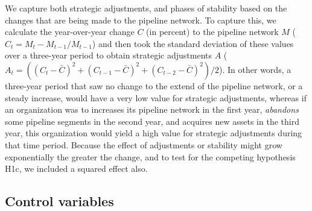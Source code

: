 We capture both strategic adjustments, and phases of stability based on the changes that are being made to the pipeline network. To capture this, we calculate the year-over-year change $C$ (in percent) to the pipeline network $M$ ($C_{t} = M_{t} - M_{t-1}/M_{t-1}$) and then took the standard deviation of these values over a three-year period to obtain strategic adjustments $A$ ($A_{t} = ((C_{t} - \bar{C})^2 + (C_{t-1} - \bar{C})^2 + (C_{t-2} - \bar{C})^2) / 2$). In other words, a three-year period that saw no change to the extend of the pipeline network, or a steady increase, would have a very low value for strategic adjustments, whereas if an organization was to increases its pipeline network in the first year, \textit{abandons} some pipeline segments in the second year, and acquires new assets in the third year, this organization would yield a high value for strategic adjustments during that time period. Because the effect of adjustments or stability might grow exponentially the greater the change, and to test for the competing hypothesis H1c, we included a squared effect also.

\subsection{Control variables}

